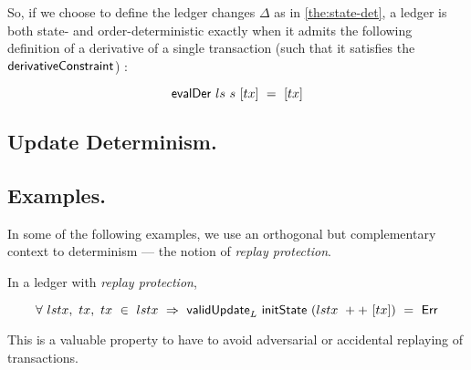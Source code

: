 So, if we choose to define the ledger changes $\Delta$ as in \ref{the:state-det},
a ledger is both state- and order-deterministic exactly when it admits
the following definition of a derivative of a single transaction (such that
it satisfies the $\mathsf{derivativeConstraint}$) :

\[\mathsf{evalDer} ~ls ~s~ [tx] ~=~ [tx] \]



\subsection{Update Determinism.~}
\label{sec:det-examples}

\subsection{Examples.~}
\label{sec:det-examples}

In some of the following examples, we use an orthogonal but complementary context
to determinism --- the notion of \emph{replay protection}.

\begin{definition}
  In a ledger with \emph{replay protection},

  \[ \forall~lstx,~tx,~tx~\in~lstx ~ \Rightarrow~\mathsf{validUpdate}_L~\mathsf{initState}~(lstx~++~[tx])~=~\mathsf{Err} \]
\end{definition}

This is a valuable property to have to avoid adversarial or accidental replaying of transactions.

